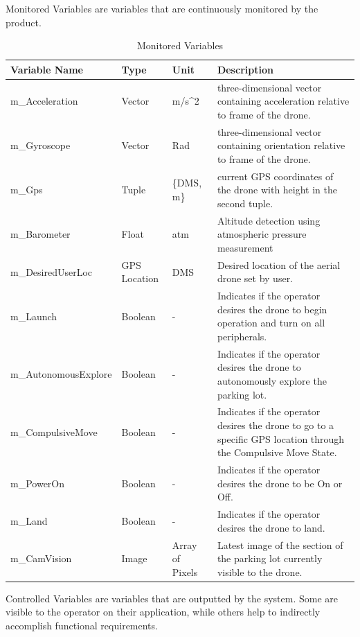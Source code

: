 \documentclass{article}
\begin{document}
\newpage
Monitored Variables are variables that are continuously monitored by the product.
\begin{table}[!h]
\begin{center}
\caption {Monitored Variables} \label{tab:title}
\begin{tabular}{ | m{3cm} | m{2cm} | m{2cm} | m{6cm} | } 
\hline
 Variable Name & Type & Unit & Description \\ 
 \hline
m\_Acceleration	& Vector& m/s^2 & three-dimensional vector containing acceleration relative to frame of the drone. \\
\hline
m\_Gyroscope & Vector	&Rad &	 three-dimensional vector containing orientation relative to frame of the drone.\\
\hline
m\_Gps	& Tuple &	\{DMS, m\} &	 current GPS coordinates of the drone with height in the second tuple.\\
\hline
m\_Barometer	& Float&	atm	 &Altitude detection using atmospheric pressure measurement\\
\hline
m\_DesiredUserLoc &	GPS Location& DMS &	 Desired location of the aerial drone set by user.\\
\hline
m\_Launch &	Boolean	 &  - &	Indicates if the operator desires the drone to begin operation and turn on all peripherals.  \\
\hline
m\_AutonomousExplore &	Boolean &	 -	 &Indicates if the operator desires the drone to autonomously explore the parking lot.\\ 
\hline
m\_CompulsiveMove &	Boolean &	 -	 &Indicates if the operator desires the drone to go to a specific GPS location through the Compulsive Move State.\\ 
\hline
m\_PowerOn&	Boolean  &	- &	Indicates if the operator desires the drone to be On or Off.\\
\hline
m\_Land&Boolean&	-&	Indicates if the operator desires the drone to land.\\
\hline
 m\_CamVision &	Image&	Array of Pixels&	Latest image of the section of the parking lot currently visible to the drone.\\
\hline

\end{tabular}
\end{center}
\end{table}

\newpage

Controlled Variables are variables that are outputted by the system. Some are visible to the operator on their application, while others help to indirectly accomplish functional requirements. 
\end{document}
